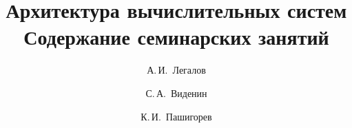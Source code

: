 \documentclass [a4paper, 12pt, oneside]{scrbook}
\begin{document}
\renewcommand\figurename{Рисунок}


\title{\Huge{Архитектура вычислительных систем\\ \large{Содержание семинарских занятий}}}
\author {{\Large{А.\,И.~Легалов}}
\and {\Large{С.\,А.~Виденин}}
\and {\Large{К.\,И.~Пашигорев}}}
\maketitle


\tableofcontents


























\end{document}
